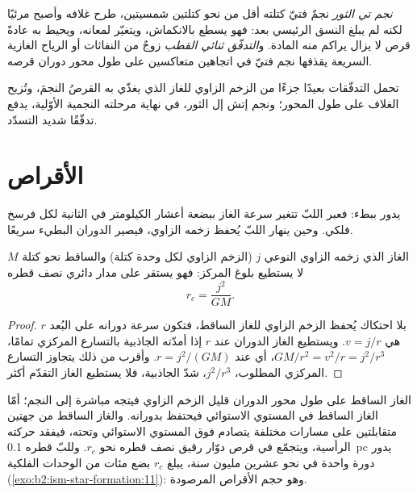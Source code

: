 \begin{definition}\label{def:b2:ism-star-formation:t-tauri}
\emph{نجم تي الثور} نجمٌ فتيّ كتلته أقل من نحو
كتلتين شمسيتين، طرح غلافه وأصبح مرئيًا لكنه لم يبلغ
النسق الرئيسي بعد: فهو يسطع بالانكماش، ويتغيّر
لمعانه، ويحيط به عادةً قرص لا يزال يراكم منه
المادة. و\emph{التدفّق ثنائي القطب} زوجٌ من النفاثات
أو الرياح الغازية السريعة يقذفها نجم فتيّ في اتجاهين متعاكسين على طول
محور دوران قرصه.
\end{definition}

تحمل التدفّقات بعيدًا جزءًا من الزخم الزاوي للغاز الذي يغذّي به القرصُ
النجمَ، وتُزيح الغلاف على طول المحور؛ ونجم
إتش إل الثور، في نهاية مرحلته النجمية الأوّلية، يدفع تدفّقًا شديد
التسدّد.

\section{الأقراص}

يدور  ببطء: فعبر اللبّ تتغير سرعة الغاز ببضعة
أعشار الكيلومتر في الثانية لكل فرسخ فلكي. وحين ينهار اللبّ يُحفظ
زخمه الزاوي، فيصير الدوران البطيء سريعًا.

\begin{proposition}\label{prop:b2:ism-star-formation:centrifugal}
الغاز الذي زخمه الزاوي النوعي $j$ (الزخم الزاوي لكل وحدة كتلة)
والساقط نحو كتلة $M$ لا يستطيع بلوغ المركز: فهو يستقر على مدار
دائري نصف قطره
\[
  r_c = \frac{j^2}{G M}.
\]
\end{proposition}

\begin{proof}
بلا احتكاك يُحفظ الزخم الزاوي للغاز الساقط، فتكون سرعة دورانه
على البُعد $r$ هي $v = j/r$. ويستطيع الغاز الدوران عند $r$ إذا
أمدّته الجاذبية بالتسارع المركزي تمامًا،
$GM/r^2 = v^2/r = j^2/r^3$، أي عند $r = j^2/(GM)$. وأقرب من ذلك يتجاوز
التسارع المركزي المطلوب، $j^2/r^3$، شدّ الجاذبية، فلا
يستطيع الغاز التقدّم أكثر.
\end{proof}

الغاز الساقط على طول محور الدوران قليل الزخم الزاوي فيتجه
مباشرة إلى النجم؛ أمّا الغاز الساقط في المستوي الاستوائي فيحتفظ
بدورانه. والغاز الساقط من جهتين متقابلتين على مسارات مختلفة يتصادم
فوق المستوي الاستوائي وتحته، فيفقد حركته الرأسية، ويتجمّع
في قرص دوّار رقيق نصف قطره نحو $r_c$. وللبّ قطره
\qty{0.1}{pc} يدور دورة واحدة في نحو عشرين مليون سنة، يبلغ $r_c$ بضع
مئات من الوحدات الفلكية (\cref{exo:b2:ism-star-formation:11}): وهو حجم الأقراص المرصودة.

